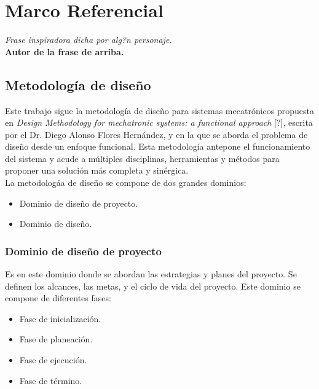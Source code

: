 \chapter{Marco Referencial} \label{ch:marcoref}

\begin{flushright}
\small\textit{Frase inspiradora dicha por alg?n personaje.}\\
		\small\textbf{Autor de la frase de arriba.}
\end{flushright}

	\section{Metodolog\'ia de dise\~{n}o} \label{sec:metodologia}
Este trabajo sigue la metodolog\'ia de dise\~{n}o para sistemas mecatr\'onicos propuesta en \textit{Design Methodology for mechatronic systems: a functional approach} [?], escrita por el Dr. Diego Alonso Flores Hern\'andez, y en la que se aborda el problema de dise\~{n}o desde un enfoque funcional. Esta metodolog\'ia antepone el funcionamiento del sistema y acude a m\'ultiples disciplinas, herramientas y m\'etodos para proponer una soluci\'on m\'as completa y sin\'ergica.\\

\noindent La metodolog\'aa de dise\~{n}o se compone de dos grandes dominios:

\begin{itemize}
	\item Dominio de dise\~{n}o de proyecto.
	\item Dominio de dise\~{n}o.
\end{itemize}

		\subsection*{Dominio de dise\~{n}o de proyecto}
\noindent Es en este dominio donde se abordan las estrategias y planes del proyecto. Se definen los alcances, las metas, y el ciclo de vida del proyecto. Este dominio se compone de diferentes fases:

\begin{itemize}
	\item Fase de inicializaci\'on. 
	\item Fase de planeaci\'on.
	\item Fase de ejecuci\'on.
	\item Fase de t\'ermino.
\end{itemize}

